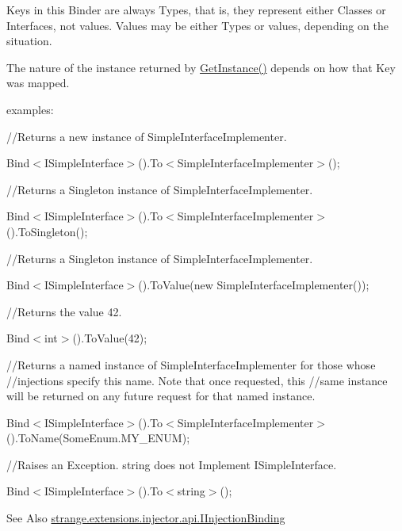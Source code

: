 Keys in this Binder are always Types, that is, they represent either Classes or Interfaces, not values. Values may be either Types or values, depending on the situation.

The nature of the instance returned by {\ttfamily \hyperlink{interfacestrange_1_1extensions_1_1injector_1_1api_1_1_i_injection_binder_aac899bd51070e8565fabab3a248cf3a5}{Get\-Instance()}} depends on how that Key was mapped.

examples\-:

//\-Returns a new instance of Simple\-Interface\-Implementer.

{\ttfamily Bind$<$I\-Simple\-Interface$>$().To$<$Simple\-Interface\-Implementer$>$();}

//\-Returns a Singleton instance of Simple\-Interface\-Implementer.

{\ttfamily Bind$<$I\-Simple\-Interface$>$().To$<$Simple\-Interface\-Implementer$>$().To\-Singleton();}

//\-Returns a Singleton instance of Simple\-Interface\-Implementer.

{\ttfamily Bind$<$I\-Simple\-Interface$>$().To\-Value(new Simple\-Interface\-Implementer());}

//\-Returns the value 42.

{\ttfamily Bind$<$int$>$().To\-Value(42);}

//\-Returns a named instance of Simple\-Interface\-Implementer for those whose //injections specify this name. Note that once requested, this //same instance will be returned on any future request for that named instance.

{\ttfamily Bind$<$I\-Simple\-Interface$>$().To$<$Simple\-Interface\-Implementer$>$().To\-Name(Some\-Enum.\-M\-Y\-\_\-\-E\-N\-U\-M);}

//\-Raises an Exception. string does not Implement I\-Simple\-Interface.

{\ttfamily Bind$<$I\-Simple\-Interface$>$().To$<$string$>$();}

\begin{DoxySeeAlso}{See Also}
\hyperlink{interfacestrange_1_1extensions_1_1injector_1_1api_1_1_i_injection_binding}{strange.\-extensions.\-injector.\-api.\-I\-Injection\-Binding} 
\end{DoxySeeAlso}


